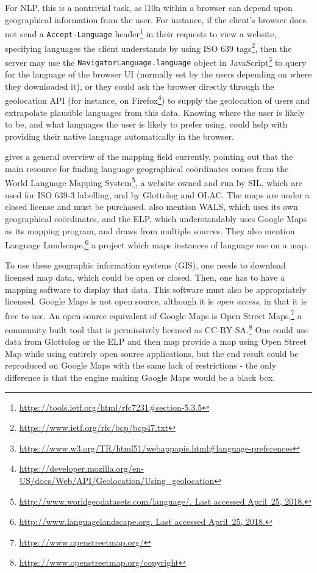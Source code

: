 For NLP, this is a nontrivial task, as l10n within a browser can depend upon geographical information from the user. For instance, if the client's browser does not send a {\tt Accept-Language} header\footnote{\href{https://tools.ietf.org/html/rfc7231\#section-5.3.5}{https://tools.ietf.org/html/rfc7231\#section-5.3.5}} in their requests to view a website, specifying languages the client understands by using ISO 639 tags\footnote{\href{https://www.ietf.org/rfc/bcp/bcp47.txt}{https://www.ietf.org/rfc/bcp/bcp47.txt}}, then the server may use the {\tt NavigatorLanguage.language} object in JavaScript\footnote{\href{https://www.w3.org/TR/html51/webappapis.html\#language-preferences}{https://www.w3.org/TR/html51/webappapis.html\#language-preferences}} to query for the language of the browser UI (normally set by the users depending on where they downloaded it), or they could ask the browser directly through the geolocation API (for instance, on Firefox\footnote{\href{https://developer.mozilla.org/en-US/docs/Web/API/Geolocation/Using\_geolocation}{https://developer.mozilla.org/en-US/docs/Web/API/Geolocation/Using\_geolocation}}) to supply the geolocation of users and extrapolate plausible languages from this data. Knowing where the user is likely to be, and what languages the user is likely to prefer using, could help with providing their native language automatically in the browser.

\citet{gawne2016mapmaking} gives a general overview of the mapping field currently, pointing out that the main resource for finding language geographical co\"ordinates comes from the World Language Mapping System\footnote{\href{http://www.worldgeodatasets.com/language/.}{http://www.worldgeodatasets.com/language/. Last accessed April~25, 2018.}}, a website owned and run by SIL, which are used for ISO 639-3 labelling, and by Glottolog and OLAC. The maps are under a closed license and must be purchased. \citet{gawne2016mapmaking} also mention WALS, which uses its own geographical co\"ordinates, and the ELP, which understandably uses Google Maps as its mapping program, and draws from multiple sources. They also mention Language Landscape,\footnote{\href{http://www.languagelandscape.org/}{http://www.languagelandscape.org. Last accessed April~25, 2018.}} a project which maps instances of language use on a map.

To use these geographic information systems (GIS), one needs to download licensed map data, which could be open or closed. Then, one has to have a mapping software to display that data. This software must also be appropriately licensed. Google Maps is not open source, although it is {\it open access}, in that it is free to use. An open source equivalent of Google Maps is Open Street Maps,\footnote{\href{https://www.openstreetmap.org/}{https://www.openstreetmap.org/}} a community built tool that is permissively licensed as CC-BY-SA.\footnote{\href{https://www.openstreetmap.org/copyright}{https://www.openstreetmap.org/copyright}} One could use data from Glottolog or the ELP and then map provide a map using Open Street Map while using entirely open source applications, but the end result could be reproduced on Google Maps with the same lack of restrictions - the only difference is that the engine making Google Maps would be a black box. 

